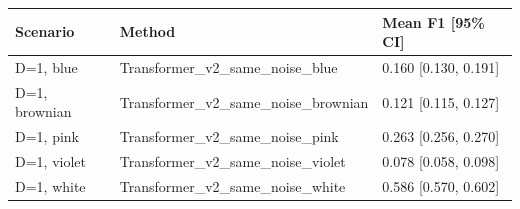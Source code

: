 \begin{tabular}{lll}
\toprule
Scenario & Method & Mean F1 [95\% CI] \\
\midrule
D=1, blue & Transformer\_v2\_same\_noise\_blue & 0.160 [0.130, 0.191] \\
D=1, brownian & Transformer\_v2\_same\_noise\_brownian & 0.121 [0.115, 0.127] \\
D=1, pink & Transformer\_v2\_same\_noise\_pink & 0.263 [0.256, 0.270] \\
D=1, violet & Transformer\_v2\_same\_noise\_violet & 0.078 [0.058, 0.098] \\
D=1, white & Transformer\_v2\_same\_noise\_white & 0.586 [0.570, 0.602] \\
\bottomrule
\end{tabular}
